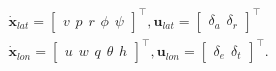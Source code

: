 \begin{equation}
\begin{split}
	&\mathbf{\dot{x}}_{lat} = 
	\begin{bmatrix}
		v \hspace{5pt} p \hspace{5pt} r \hspace{5pt} \phi \hspace{5pt} \psi
	\end{bmatrix} ^\intercal
	, \mathbf{u}_{lat} =
	\begin{bmatrix}
		\delta_a \hspace{5pt} \delta_r
	\end{bmatrix}^\intercal \\
	&\mathbf{\dot{x}}_{lon} =
	\begin{bmatrix}
		u \hspace{5pt} w \hspace{5pt} q \hspace{5pt} \theta \hspace{5pt} h
	\end{bmatrix}^\intercal
	, \mathbf{u}_{lon} =
	\begin{bmatrix}
		\delta_e \hspace{5pt} \delta_t
	\end{bmatrix}^\intercal.
\end{split}
\end{equation}






